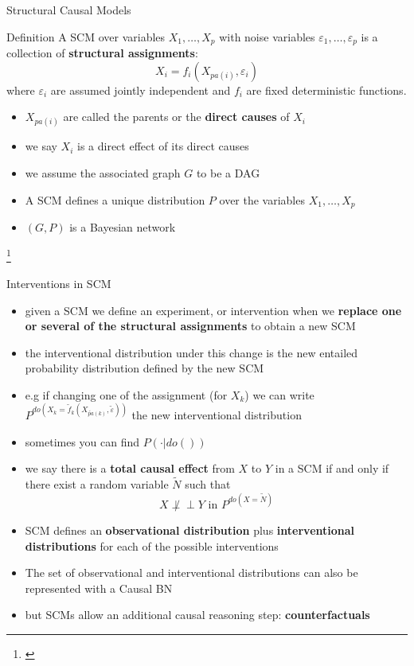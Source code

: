 \documentclass{beamer}
\newcommand{\indep}{\perp \!\!\! \perp}
\newcommand\blfootnote[1]{%
  \begingroup
  \renewcommand\thefootnote{}\footnote{#1}%
  \addtocounter{footnote}{-1}%
  \endgroup
}
\begin{document}
\begin{frame}{Structural Causal Models}
	\begin{block}{Definition \citep{peters2017elements}}
 A SCM over variables $X_1, \ldots, X_p$ with noise variables $\varepsilon_1, \ldots, \varepsilon_p$ is 
	 a collection of \textbf{structural assignments}: 
	   \[ X_i =  f_i(X_{pa(i)}, \varepsilon_i) \]
	   where $\varepsilon_i$ are assumed jointly independent and $f_i$ are fixed deterministic functions.  
	 \end{block}
	 \begin{itemize}
		 \item $X_{pa(i)}$ are called the parents or the \textbf{direct causes} of $X_i$
		 \item we say $X_i$ is a direct effect of its direct causes 
		 \item we assume the associated graph $G$ to be a DAG 
		 \item<2-> A SCM defines a unique distribution $P$ over the variables $X_1, \ldots, X_p$ 
		 \item<3-> $(G, P)$ is a Bayesian network 
	 \end{itemize}
	 \blfootnote{\citet{bareinboim2022pearl}}
\end{frame}


\begin{frame}{Interventions in SCM}
	\begin{itemize}
		\item given a SCM we define an experiment, or intervention when we \textbf{replace one or several of the structural assignments} to obtain a new SCM
		\item<2-> the interventional distribution under this change is the new entailed probability distribution defined by the new SCM
		\item<3-> e.g if changing one of the assignment (for $X_k$) we can write $P^{do(X_k = \tilde{f}_k(X_{\tilde{pa}(k)}, \tilde{\varepsilon}))}$ the new interventional distribution 
		\item<3-> sometimes you can find $P(\cdot| do())$ 
		\item<4-> we say there is a \textbf{total causal effect} from $X$ to $Y$ in a SCM 
			if and only if there exist a random variable $\tilde{N}$ such that 
			\[ X \not \indep Y \text{ in } P^{do(X = \tilde{N})} \]
	\end{itemize}
\end{frame}

\begin{frame}
	\begin{itemize}
		\item SCM defines an \textbf{observational distribution} plus \textbf{interventional distributions} for each of the possible interventions 
		\item The set of observational and interventional distributions can also be represented with a Causal BN 
		\item<2-> but SCMs allow an additional causal reasoning step: \textbf{counterfactuals}  
	\end{itemize}
\end{frame}
\end{document}
